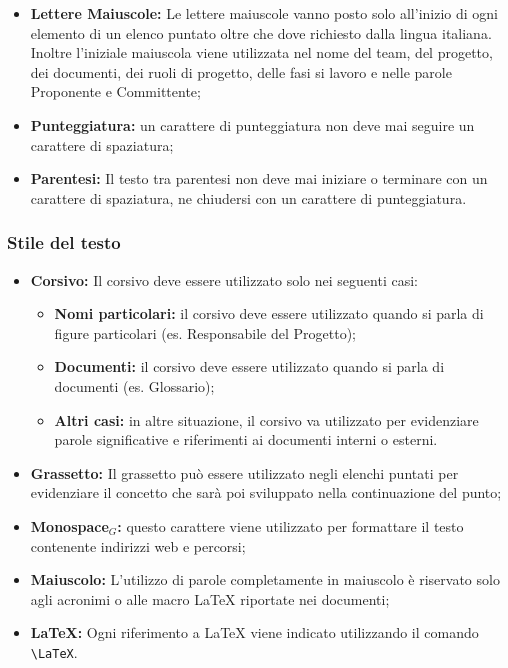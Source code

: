 \begin{itemize}
\item \textbf{Lettere Maiuscole:} Le lettere maiuscole vanno posto solo  all'inizio di ogni elemento di un elenco puntato oltre che dove richiesto dalla lingua italiana. Inoltre l'iniziale maiuscola viene utilizzata nel nome del team, del progetto, dei documenti, dei ruoli di progetto, delle fasi si lavoro e nelle parole Proponente e Committente;
\item \textbf{Punteggiatura:} un carattere di punteggiatura non deve mai seguire un carattere di spaziatura;
\item \textbf{Parentesi:} Il testo tra parentesi non deve mai iniziare o terminare con un carattere di spaziatura, ne chiudersi con un carattere di punteggiatura.
\end{itemize}

\subsubsection{Stile del testo}

\begin{itemize}
\item \textbf{Corsivo:} Il corsivo deve essere utilizzato solo nei seguenti casi:
\begin{itemize}
\item \textbf{Nomi particolari:} il corsivo deve essere utilizzato quando si parla di figure particolari (es. Responsabile del Progetto);
\item \textbf{Documenti:} il corsivo deve essere utilizzato quando si parla di documenti (es. Glossario);
\item \textbf{Altri casi:} in altre situazione, il corsivo va utilizzato per evidenziare parole significative e riferimenti ai documenti interni o esterni.
\end{itemize} 
\item \textbf{Grassetto:} Il grassetto può essere utilizzato negli elenchi puntati per evidenziare il concetto che sarà poi sviluppato nella continuazione del punto;
\item \textbf{Monospace$_{G}$:} questo carattere viene utilizzato per formattare il testo contenente indirizzi web e percorsi;
\item \textbf{Maiuscolo:} L'utilizzo di parole completamente in maiuscolo è riservato solo agli acronimi o alle macro \LaTeX{} riportate nei documenti;
\item \textbf{\LaTeX:} Ogni riferimento a \LaTeX{} viene indicato utilizzando il comando \verb|\LaTeX|.
\end{itemize}

